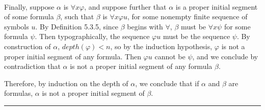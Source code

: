 \documentclass[11pt]{hmcpset}
\newenvironment{proof}{\noindent {\bf Proof:} \\}{\hfill
\rule{1mm}{3mm} \bigskip}
\begin{document}
\begin{proof}
Finally, suppose $\alpha$ is $\forall x\varphi$, and suppose further that $\alpha$ is a proper initial segment of some formula $\beta$, such that $\beta$ is $\forall x\varphi u$, for some nonempty finite sequence of symbols $u$. By Definition 5.3.5, since $\beta$ begins with $\forall$, $\beta$ must be $\forall x\psi$ for some formula $\psi$. Then typographically, the sequence $\varphi u$ must be the sequence $\psi$. By construction of $\alpha$, $depth(\varphi) < n$, so by the induction hypothesis, $\varphi$ is not a proper initial segment of any formula. Then $\varphi u$ cannot be $\psi$, and we conclude by contradiction that $\alpha$ is not a proper initial segment of any formula $\beta$.

Therefore, by induction on the depth of $\alpha$, we conclude that if $\alpha$ and $\beta$ are formulas, $\alpha$ is not a proper initial segment of $\beta$.
\end{proof}
\end{document}
